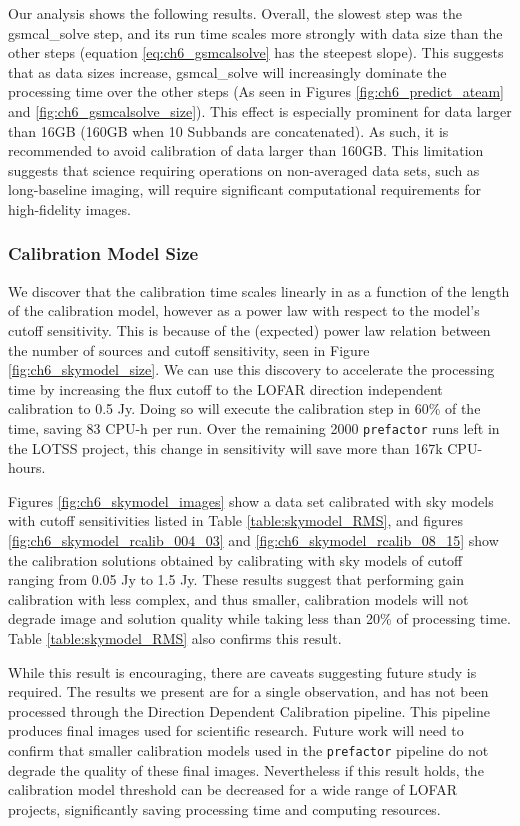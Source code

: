 Our analysis shows the following results. Overall, the slowest step was the {\selectfont gsmcal\_solve} step, and its run time scales more strongly with data size than the other steps (equation \ref{eq:ch6_gsmcalsolve} has the steepest slope). This suggests that as data sizes increase, {\selectfont gsmcal\_solve} will increasingly dominate the processing time over the other steps (As seen in Figures \ref{fig:ch6_predict_ateam} and \ref{fig:ch6_gsmcalsolve_size}). This effect is especially prominent for data larger than 16GB (160GB when 10 Subbands are concatenated). As such, it is recommended to avoid calibration of data larger than 160GB. This limitation suggests that science requiring operations on non-averaged data sets, such as long-baseline imaging, will require significant computational requirements for high-fidelity images.

\subsubsection{Calibration Model Size}
We discover that the calibration time scales linearly in as a function of the length of the calibration model, however as a power law with respect to the model's cutoff sensitivity. This is because of the (expected) power law relation between the number of sources and cutoff sensitivity, seen in Figure \ref{fig:ch6_skymodel_size}. We can use this discovery to accelerate the processing time by increasing the flux cutoff to the LOFAR direction independent calibration to 0.5 Jy. Doing so will execute the calibration step in 60\% of the time, saving 83 CPU-h per run. Over the remaining 2000 \texttt{prefactor} runs left in the LOTSS project, this change in sensitivity will save more than 167k CPU-hours. 

Figures \ref{fig:ch6_skymodel_images} show a data set calibrated with sky models with cutoff sensitivities listed in Table \ref{table:skymodel_RMS}, and figures  \ref{fig:ch6_skymodel_rcalib_004_03} and \ref{fig:ch6_skymodel_rcalib_08_15} show the calibration solutions obtained by calibrating with sky models of cutoff ranging from 0.05 Jy to 1.5 Jy. These results suggest that performing gain calibration with less complex, and thus smaller, calibration models will not degrade image and solution quality while taking less than 20\% of processing time. Table \ref{table:skymodel_RMS} also confirms this result. 

While this result is encouraging, there are caveats suggesting future study is required. The results we present are for a single observation, and has not been processed through the Direction Dependent Calibration pipeline. This pipeline produces final images used for scientific research. Future work will need to confirm that smaller calibration models used in the \texttt{prefactor} pipeline do not degrade the quality of these final images. Nevertheless if this result holds, the calibration model threshold can be decreased for a wide range of LOFAR projects, significantly saving processing time and computing resources. 

